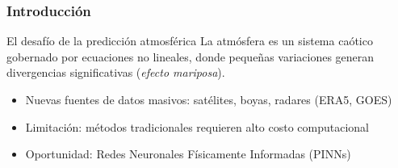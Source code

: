 \begin{frame}[fragile]
  \frametitle{Introducción}
  
  \begin{block}{El desafío de la predicción atmosférica}
    La atmósfera es un sistema caótico gobernado por ecuaciones no lineales, donde pequeñas variaciones generan divergencias significativas (\emph{efecto mariposa}).
  \end{block}
  
  \begin{itemize}
    \item Nuevas fuentes de datos masivos: satélites, boyas, radares (ERA5, GOES)
    \item Limitación: métodos tradicionales requieren alto costo computacional
    \item Oportunidad: Redes Neuronales Físicamente Informadas (PINNs)
  \end{itemize}
  
\end{frame}
